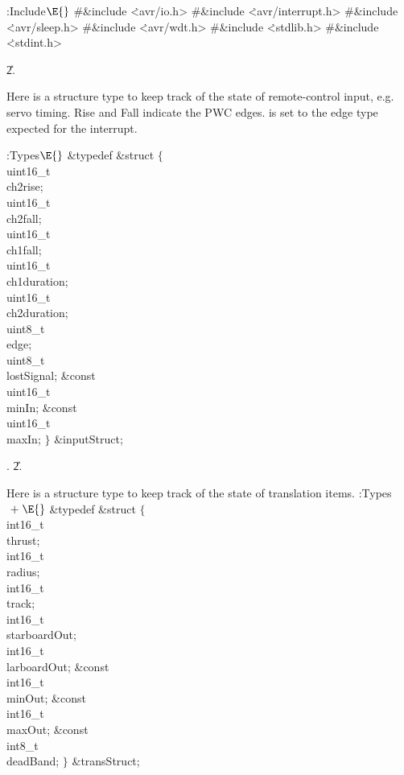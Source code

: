 \B{}:Include\X${}\E{}$\6
\8\#\&{include} \.{<avr/io.h>}\6
\8\#\&{include} \.{<avr/interrupt.h>}\6
\8\#\&{include} \.{<avr/sleep.h>}\6
\8\#\&{include} \.{<avr/wdt.h>}\6
\8\#\&{include} \.{<stdlib.h>}\6
\8\#\&{include} \.{<stdint.h>}\par
\U2.\fi

Here is a structure type to keep track of the state of remote-control
input, e.g. servo timing. Rise and Fall indicate the PWC edges.
 is set to the edge type expected for the interrupt.

\Y\B\4:Types\X${}\E{}$\6
\&{typedef} \&{struct} ${}\{{}$\1\6
\\{uint16\_t}\\{ch2rise};\6
\\{uint16\_t}\\{ch2fall};\6
\\{uint16\_t}\\{ch1fall};\6
\\{uint16\_t}\\{ch1duration};\6
\\{uint16\_t}\\{ch2duration};\6
\\{uint8\_t}\\{edge};\6
\\{uint8\_t}\\{lostSignal};\7
\&{const} \\{uint16\_t}\\{minIn};\6
\&{const} \\{uint16\_t}\\{maxIn};\2\6
${}\}{}$ \&{inputStruct};\par
{}.
\U2.\fi

Here is a structure type to keep track of the state of translation items.
\Y\B\4:Types\X${}\mathrel+\E{}$\6
\&{typedef} \&{struct} ${}\{{}$\1\6
\\{int16\_t}\\{thrust};\6
\\{int16\_t}\\{radius};\6
\\{int16\_t}\\{track};\6
\\{int16\_t}\\{starboardOut};\6
\\{int16\_t}\\{larboardOut};\7
\&{const} \\{int16\_t}\\{minOut};\6
\&{const} \\{int16\_t}\\{maxOut};\6
\&{const} \\{int8\_t}\\{deadBand};\2\6
${}\}{}$ \&{transStruct};\par
\fi

